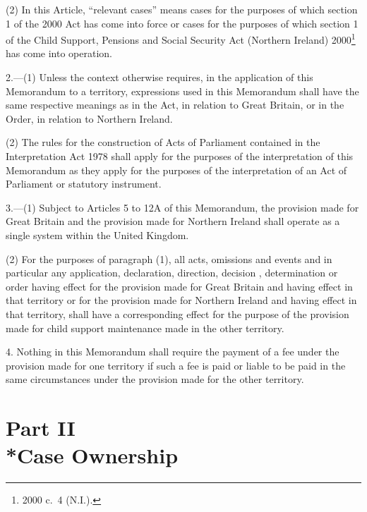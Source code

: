 \documentclass[12pt,a4paper]{article}
\begin{document}
(2) In this Article, “relevant cases” means cases for the purposes of which section 1 of the 2000 Act has come into force or cases for the purposes of which section 1 of the Child Support, Pensions and Social Security Act (Northern Ireland) 2000\footnote{2000 c.\ 4 (N.I.).} has come into operation.


\medskip

2.—(1) Unless the context otherwise requires, in the application of this Memorandum to a territory, expressions used in this Memorandum shall have the same respective meanings as in the Act, in relation to Great Britain, or in the Order, in relation to Northern Ireland.

(2) The rules for the construction of Acts of Parliament contained in the Interpretation Act 1978 shall apply for the purposes of the interpretation of this Memorandum as they apply for the purposes of the interpretation of an Act of Parliament or statutory instrument.

\medskip

3.—(1) Subject to Articles 5 to 
12A  %
of this Memorandum, the provision made for Great Britain and the provision made for Northern Ireland shall operate as a single system within the United Kingdom.

(2) For the purposes of paragraph (1), all acts, omissions and events and in particular any application, declaration, direction, decision%
, determination  %
or order having effect for the provision made for Great Britain and having effect in that territory or for the provision made for Northern Ireland and having effect in that territory, shall have a corresponding effect for the purpose of the provision made for child support maintenance made in the other territory.


\medskip

4.  Nothing in this Memorandum shall require the payment of a fee under the provision made for one territory if such a fee is paid or liable to be paid in the same circumstances under the provision made for the other territory.

\section[Part II --- Case Ownership]{Part II\\*Case Ownership}
\end{document}
